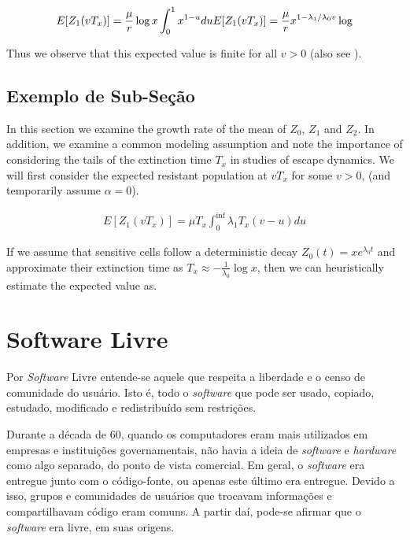 \documentclass{classe_cn}                 %
\begin{document}
\begin{equation}
  E [Z_1(vT_x)] = \frac{\mu}{r}\log x \int_0^{1} x^{1-u} du \\
  E [Z_1(vT_x)] = \frac{\mu}{r}x^{1-{\lambda_1}/{\lambda_0}v}\log 
\end{equation}

Thus we observe that this expected value is finite for all $v>0$ (also see \cite{Rosenfeld:1970}).

\subsection{Exemplo de Sub-Seção}

In this section we examine the growth rate of the mean of $Z_0$, $Z_1$ and $Z_2$. In addition, we examine a common modeling assumption and note the importance of considering the tails of the extinction time $T_x$ in studies of escape dynamics. We will first consider the expected resistant population at $vT_x$ for some $v>0$, (and temporarily assume $\alpha=0$).

\begin{eqnarray}
E [Z_1(vT_x)]= \mu T_x \int_{0}^{\inf} \lambda_1T_x(v-u)du
\end{eqnarray}

If we assume that sensitive cells follow a deterministic decay $Z_0(t)=xe^{\lambda_0 t}$ and approximate their extinction time as $T_x\approx-\frac{1}{\lambda_0}\log x$, then we can heuristically estimate the expected value as.

\section{Software Livre}

Por \textit{Software} Livre entende-se aquele que respeita a liberdade e o censo de comunidade do usuário. Isto é, todo o \textit{software} que pode ser usado, copiado, estudado, modificado e redistribuído sem restrições.

Durante a década de 60, quando os computadores eram mais utilizados em empresas e instituições governamentais, não havia a ideia de \textit{software} e \textit{hardware} como algo separado, do ponto de vista comercial. Em geral, o \textit{software} era entregue junto com o código-fonte, ou apenas este último era entregue. Devido a isso, grupos e comunidades de usuários que trocavam informações e compartilhavam código eram comuns. A partir daí, pode-se afirmar que o \textit{software} era livre, em suas origens.
\end{document}
